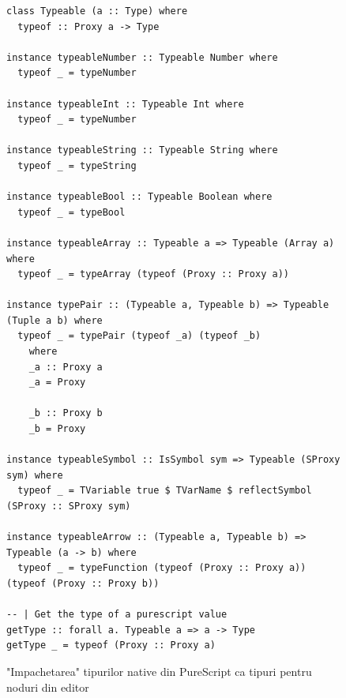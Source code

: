 \documentclass{article}
\begin{document}
\begin{figure}[ht]
	\centering
	\begin{verbatim}
class Typeable (a :: Type) where
  typeof :: Proxy a -> Type

instance typeableNumber :: Typeable Number where
  typeof _ = typeNumber

instance typeableInt :: Typeable Int where
  typeof _ = typeNumber

instance typeableString :: Typeable String where
  typeof _ = typeString

instance typeableBool :: Typeable Boolean where
  typeof _ = typeBool

instance typeableArray :: Typeable a => Typeable (Array a) where
  typeof _ = typeArray (typeof (Proxy :: Proxy a))

instance typePair :: (Typeable a, Typeable b) => Typeable (Tuple a b) where
  typeof _ = typePair (typeof _a) (typeof _b)
    where
    _a :: Proxy a
    _a = Proxy
    
    _b :: Proxy b
    _b = Proxy

instance typeableSymbol :: IsSymbol sym => Typeable (SProxy sym) where
  typeof _ = TVariable true $ TVarName $ reflectSymbol (SProxy :: SProxy sym)

instance typeableArrow :: (Typeable a, Typeable b) => Typeable (a -> b) where
  typeof _ = typeFunction (typeof (Proxy :: Proxy a)) (typeof (Proxy :: Proxy b))

-- | Get the type of a purescript value
getType :: forall a. Typeable a => a -> Type
getType _ = typeof (Proxy :: Proxy a)
\end{verbatim}
	\caption{"Impachetarea" tipurilor native din PureScript ca tipuri pentru noduri din editor}
	\label{fig:typeable}
\end{figure}
\end{document}
